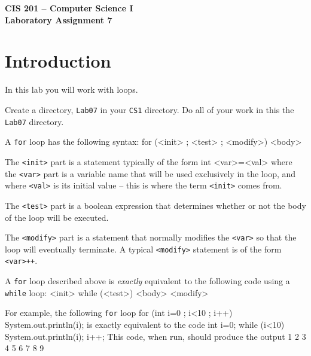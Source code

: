 \documentclass[12pt]{article}
\newenvironment{qv}%
  {\quote
   \verbatim}%
  {\endverbatim
   \endquote}
\newcommand{\fname}{\texttt}
\begin{document}
\sloppypar

\begin{center}
\Large\bf
CIS 201 -- Computer Science I\\
Laboratory Assignment 7\\
\end{center}

\section*{Introduction}

In this lab you will work with loops.

Create a directory, \fname{Lab07} in your \fname{CS1} directory.
Do all of your work in this the \fname{Lab07} directory.

A \verb'for' loop has the following syntax:
\begin{qv}
for (<init> ; <test> ; <modify>) {
  <body>
}
\end{qv}

The \verb'<init>' part is a statement typically of the form
\begin{qv}
int <var>=<val>
\end{qv}
where the \verb'<var>' part is a variable name
that will be used exclusively in the loop,
and where \verb'<val>' is its initial value --
this is where the term \verb'<init>' comes from.

The \verb'<test>' part is a boolean expression
that determines whether or not the body of the loop will be executed.

The \verb'<modify>' part is a statement
that normally modifies the \verb'<var>'
so that the loop will eventually terminate.
A typical \verb'<modify>' statement is of the form \verb'<var>++'.

A \verb'for' loop described above is {\em exactly} equivalent
to the following code using a \verb'while' loop:
\begin{qv}
<init>
while (<test>) {
  <body>
  <modify>
}
\end{qv}

For example, the following \verb'for' loop
\begin{qv}
for (int i=0 ; i<10 ; i++) {
  System.out.println(i);
}
\end{qv}
is exactly equivalent to the code
\begin{qv}
int i=0;
while (i<10) {
  System.out.println(i);
  i++;
}
\end{qv}
This code, when run, should produce the output
\begin{qv}
0
1
2
3
4
5
6
7
8
9
\end{qv}
\end{document}

